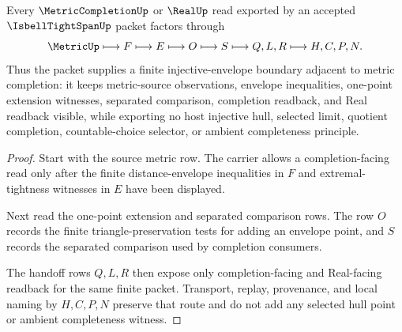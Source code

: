\begin{theorem}
\label{thm:isbell-tight-span-metric-handoff}
Every $\MetricCompletionUp$ or $\RealUp$ read exported by an accepted $\IsbellTightSpanUp$ packet factors through
$$
\MetricUp\longmapsto F\longmapsto E\longmapsto O\longmapsto S\longmapsto Q,L,R\longmapsto H,C,P,N .
$$
Thus the packet supplies a finite injective-envelope boundary adjacent to metric completion: it keeps metric-source observations, envelope inequalities, one-point extension witnesses, separated comparison, completion readback, and Real readback visible, while exporting no host injective hull, selected limit, quotient completion, countable-choice selector, or ambient completeness principle.
\end{theorem}
\begin{proof}
Start with the source metric row. The carrier allows a completion-facing read only after the finite distance-envelope inequalities in $F$ and extremal-tightness witnesses in $E$ have been displayed.

Next read the one-point extension and separated comparison rows. The row $O$ records the finite triangle-preservation tests for adding an envelope point, and $S$ records the separated comparison used by completion consumers.

The handoff rows $Q,L,R$ then expose only completion-facing and Real-facing readback for the same finite packet. Transport, replay, provenance, and local naming by $H,C,P,N$ preserve that route and do not add any selected hull point or ambient completeness witness.
\end{proof}




